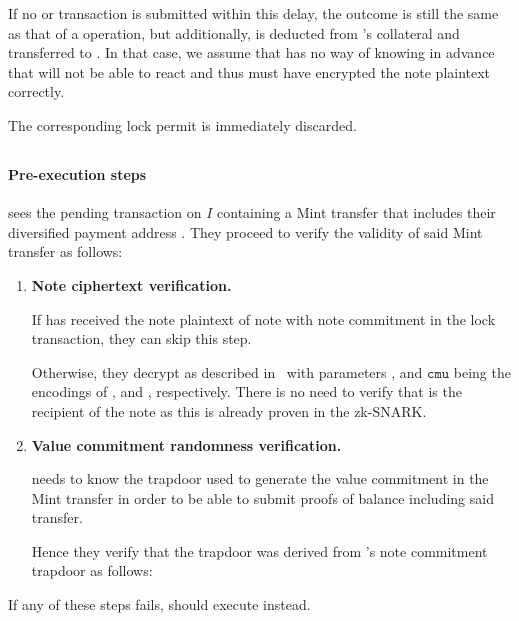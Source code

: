 If no \confirmIssue or \challengeIssue transaction is submitted within this delay, the outcome is still the same as that of a \confirmIssue operation, but additionally, \iw is deducted from \vault's collateral and transferred to \issuer.
In that case, we assume that \issuer has no way of knowing in advance that \vault will not be able to react and thus must have encrypted the note plaintext correctly.

The corresponding lock permit is immediately discarded.

\subsection{\confirmIssueop}
\label{sec:confirm_issue}

\paragraph{Pre-execution steps}
\vault sees the pending \mint transaction on $I$ containing a Mint transfer that includes their diversified payment address \dpa.
They proceed to verify the validity of said Mint transfer as follows:
\begin{enumerate}
    \item \textbf{Note ciphertext verification.}
    
    If \vault has received the note plaintext of note \n with note commitment \cmun in the lock transaction, they can skip this step.
    
    Otherwise, they decrypt \cencn as described in~\cite[Section 4.17.2]{hopwood2016zcash} with parameters \ephkey, \cenc and $\mathtt{cmu}$ being the encodings of \epkn, \cencn and \cmun, respectively.
    There is no need to verify that \vault is the recipient of the note as this is already proven in the zk-SNARK.
    
    \item \textbf{Value commitment randomness verification.}
    
    \vault needs to know the trapdoor used to generate the value commitment \cv in the Mint transfer in order to be able to submit proofs of balance including said transfer.
    
    Hence they verify that the trapdoor was derived from \n's note commitment trapdoor as follows:
\end{enumerate}
If any of these steps fails, \vault should execute \challengeIssueop instead.

